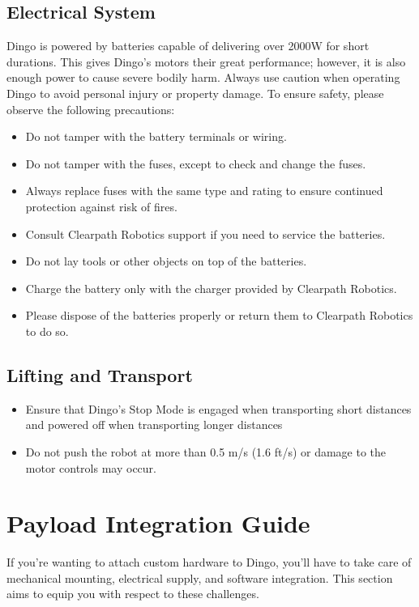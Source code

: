 \documentclass[]{clearpath-latex/clearpath-manual}
\begin{document}
\subsection{Electrical System}

Dingo is powered by batteries capable of delivering over 2000W for short durations. This gives Dingo's motors their great performance; however, it is also enough power to cause severe bodily harm. Always use caution when operating Dingo to avoid personal injury or property damage.  To ensure safety, please observe the following precautions:

\begin{itemize}[nolistsep]
	\item Do not tamper with the battery terminals or wiring.
	\item Do not tamper with the fuses, except to check and change the fuses.
	\item Always replace fuses with the same type and rating to ensure continued protection against risk of fires.
	\item Consult Clearpath Robotics support if you need to service the batteries.
	\item Do not lay tools or other objects on top of the batteries.
	\item Charge the battery only with the charger provided by Clearpath Robotics.
	\item Please dispose of the batteries properly or return them to Clearpath Robotics to do so.
\end{itemize}

\subsection{Lifting and Transport}

\begin{itemize}[nolistsep]
	\item Ensure that Dingo's Stop Mode is engaged when transporting short distances and powered off when transporting longer distances
	\item Do not push the robot at more than 0.5 m/s (1.6 ft/s) or damage to the motor controls may occur.
\end{itemize}


\section{Payload Integration Guide}

If you're wanting to attach custom hardware to Dingo, you'll have to take care of
mechanical mounting, electrical supply, and software integration. This section
aims to equip you with respect to these challenges.
\end{document}
